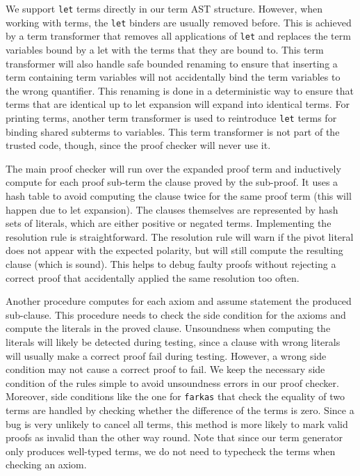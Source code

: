 \documentclass[a4paper]{easychair}
\newcommand\smtlib[1]{\texttt{#1}}
\begin{document}
We support \smtlib{let} terms directly in our term AST structure.
However, when working with terms, the \smtlib{let} binders are usually removed before.
This is achieved by a term transformer that removes all applications of \smtlib{let} and replaces the term variables bound by a let with the terms that they are bound to.
This term transformer will also handle safe bounded renaming to ensure that inserting a term containing term variables will not accidentally bind the term variables to the wrong quantifier.
This renaming is done in a deterministic way to ensure that terms that are identical up to let expansion will expand into identical terms.
For printing terms, another term transformer is used to reintroduce \smtlib{let} terms for binding shared subterms to variables.
This term transformer is not part of the trusted code, though, since the proof checker will never use it.

The main proof checker will run over the expanded proof term and inductively compute for each proof sub-term the clause proved by the sub-proof.
It uses a hash table to avoid computing the clause twice for the same proof term (this will happen due to let expansion).
The clauses themselves are represented by hash sets of literals, which are either positive or negated terms.
Implementing the resolution rule is straightforward.
The resolution rule will warn if the pivot literal does not appear with the expected polarity, but will still compute the resulting clause (which is sound).
This helps to debug faulty proofs without rejecting a correct proof that accidentally applied the same resolution too often.

Another procedure computes for each axiom and assume statement the produced sub-clause.
This procedure needs to check the side condition for the axioms and compute the literals in the proved clause.
Unsoundness when computing the literals will likely be detected during testing, since a clause with wrong literals will usually make a correct proof fail during testing.
However, a wrong side condition may not cause a correct proof to fail.
We keep the necessary side condition of the rules simple to avoid unsoundness errors in our proof checker.
Moreover, side conditions like the one for \smtlib{farkas} that check the equality of two terms are handled by checking whether the difference of the terms is zero.
Since a bug is very unlikely to cancel all terms, this method is more likely to mark valid proofs as invalid than the other way round.
Note that since our term generator only produces well-typed terms, we do not need to typecheck the terms when checking an axiom.
\end{document}
